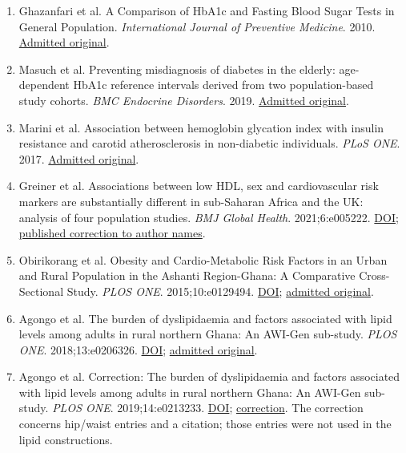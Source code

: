 \documentclass[10pt,twocolumn]{article}
\begin{document}
\begin{enumerate}
\item Ghazanfari et al. A Comparison of HbA1c and Fasting Blood Sugar Tests in General Population. \emph{International Journal of Preventive Medicine}. 2010. \href{https://pmc.ncbi.nlm.nih.gov/articles/PMC3075530/}{Admitted original}.

\item Masuch et al. Preventing misdiagnosis of diabetes in the elderly: age-dependent HbA1c reference intervals derived from two population-based study cohorts. \emph{BMC Endocrine Disorders}. 2019. \href{https://pmc.ncbi.nlm.nih.gov/articles/PMC6371438/}{Admitted original}.

\item Marini et al. Association between hemoglobin glycation index with insulin resistance and carotid atherosclerosis in non-diabetic individuals. \emph{PLoS ONE}. 2017. \href{https://pmc.ncbi.nlm.nih.gov/articles/PMC5398507/}{Admitted original}.

\item Greiner et al. Associations between low HDL, sex and cardiovascular risk markers are substantially different in sub-Saharan Africa and the UK: analysis of four population studies. \emph{BMJ Global Health}. 2021;6:e005222. \href{https://doi.org/10.1136/bmjgh-2021-005222}{DOI}; \href{https://gh.bmj.com/content/6/6/e005222corr1}{published correction to author names}.

\item Obirikorang et al. Obesity and Cardio-Metabolic Risk Factors in an Urban and Rural Population in the Ashanti Region-Ghana: A Comparative Cross-Sectional Study. \emph{PLOS ONE}. 2015;10:e0129494. \href{https://doi.org/10.1371/journal.pone.0129494}{DOI}; \href{https://journals.plos.org/plosone/article?id=10.1371/journal.pone.0129494}{admitted original}.

\item Agongo et al. The burden of dyslipidaemia and factors associated with lipid levels among adults in rural northern Ghana: An AWI-Gen sub-study. \emph{PLOS ONE}. 2018;13:e0206326. \href{https://doi.org/10.1371/journal.pone.0206326}{DOI}; \href{https://journals.plos.org/plosone/article?id=10.1371/journal.pone.0206326}{admitted original}.

\item Agongo et al. Correction: The burden of dyslipidaemia and factors associated with lipid levels among adults in rural northern Ghana: An AWI-Gen sub-study. \emph{PLOS ONE}. 2019;14:e0213233. \href{https://doi.org/10.1371/journal.pone.0213233}{DOI}; \href{https://pmc.ncbi.nlm.nih.gov/articles/PMC6392312/}{correction}. The correction concerns hip/waist entries and a citation; those entries were not used in the lipid constructions.

\end{enumerate}
\end{document}

